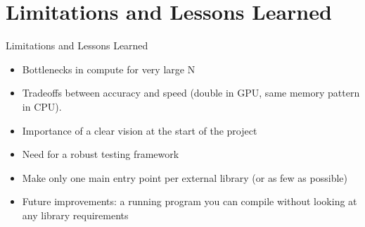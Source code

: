 \documentclass{beamer}
\begin{document}


\section{Limitations and Lessons Learned}
\begin{frame}{Limitations and Lessons Learned}
    \begin{itemize}
        \item Bottlenecks in compute for very large N
        \item Tradeoffs between accuracy and speed (double in GPU, same memory pattern in CPU).
        \item Importance of a clear vision at the start of the project
        \item Need for a robust testing framework
        \item Make only one main entry point per external library (or as few as possible)
        \item Future improvements: a running program you can compile without looking at any library requirements
    \end{itemize}
\end{frame}
\end{document}
